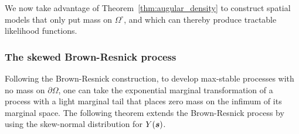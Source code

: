 \documentclass[12pt]{article}
\begin{document}
We now take advantage of Theorem~\ref{thm:augular_density} to construct spatial models that only put mass on $\Omega^\circ$, and which can thereby produce tractable likelihood functions. 

\subsubsection{The skewed Brown-Resnick process}

Following the Brown-Resnick construction, to develop max-stable processes with no mass on $\partial\Omega$, one can take the exponential marginal transformation of a process with a light marginal tail that places zero mass on the infimum of its 
marginal 
space. 
The following theorem extends the Brown-Resnick process by 
using the skew-normal distribution for $Y({\boldsymbol{s}})$.
\end{document}
